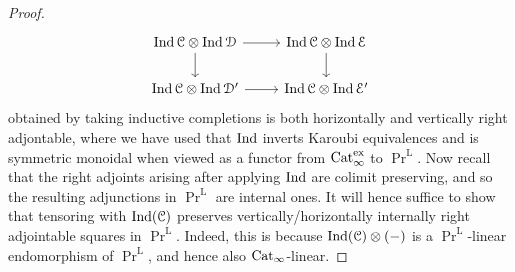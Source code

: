 \begin{proof}
\[
\begin{tikzcd}
\Ind\C\otimes\Ind\D \ar[r]\ar[d] & \Ind\C\otimes\Ind\E \ar[d] \\
\Ind\C\otimes \Ind\D' \ar[r] & \Ind\C \otimes \Ind\E'
\end{tikzcd}
\]
obtained by taking inductive completions is both horizontally and vertically right adjontable, where we have used that $\operatorname{Ind}$ inverts Karoubi equivalences and is symmetric monoidal when viewed as a functor from $\mathrm{Cat}_\infty^{\mathrm{ex}}$ to $\Pr^\mathrm L$. Now recall that the right adjoints arising after applying $\operatorname{Ind}$ are colimit preserving, and so the resulting adjunctions in $\Pr^\mathrm L$ are internal ones. It will hence suffice to show that tensoring with $\operatorname{Ind}(\mathcal C)$ preserves vertically/horizontally internally right adjointable squares in $\Pr^\mathrm L$. Indeed, this is because $\operatorname{Ind}(\mathcal C)\otimes (-)$ is a $\Pr^\mathrm L$-linear endomorphism of $\Pr^\mathrm L$, and hence also $\mathrm{Cat}_\infty$-linear.
\end{proof}






